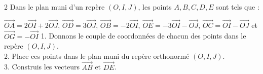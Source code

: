\begin{multicols*}{2}
  	Dans le plan muni d'un repère $(O, I, J)$, les points $A, B, C, D, E$ sont tels que :
  	
  	$ \overrightarrow{OA} = 2\overrightarrow{OI} + 2\overrightarrow{OJ}$,  $  \overrightarrow{OD} = 3\overrightarrow{OJ} $,  $
  	\overrightarrow{OB} = -2\overrightarrow{OI} $,  $ \overrightarrow{OE} = -3\overrightarrow{OI} - \overrightarrow{OJ} $,  $
  	\overrightarrow{OC} = \overrightarrow{OI} - \overrightarrow{OJ} $ et $ \overrightarrow{OG} = -\overrightarrow{OI}
  	$
  	1. Donnons le couple de coordonnées de chacun des points dans le repère $(O, I, J)$. \\
  	
  	2. Place ces points dans le plan muni du repère orthonormé $(O, I, J)$. \\
  	3. Construis les vecteurs $\overrightarrow{AB}$ et $\overrightarrow{DE}$.\\
  	\dures
  	 

\end{multicols*}
